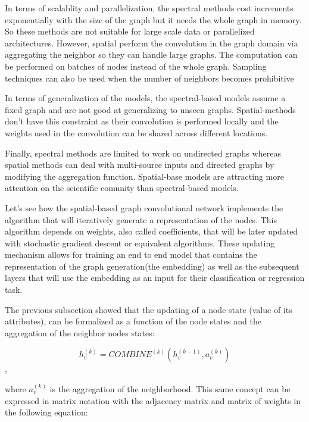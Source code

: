 In terms of scalablity and parallelization, the spectral methods  cost increments exponentially with the size of the graph but it needs the whole graph in memory. So these methods are not suitable for large scale data or parallelized architectures. However, spatial perform the convolution in the graph domain via aggregating the neighbor so they can handle large graphs. The computation can be performed on batches of nodes instead of the whole graph. Sampling techniques can also be used when the number of neighbors becomes prohibitive

In terms of generalization of the models, the spectral-based models assume a fixed graph and are not good at generalizing to unseen graphs. Spatial-methods don't have this constraint as their convolution is performed locally and the weights used in the convolution can be shared across different locations.

Finally, spectral methods are limited to work on undirected graphs whereas spatial methods can deal with multi-source inputs and directed graphs by modifying the aggregation function. Spatial-base models are attracting more attention on the scientific comunity than spectral-based models.




Let's see how the spatial-based graph convolutional network implements the algorithm that will iteratively generate a representation of the nodes. This algorithm depends on weights, also called coefficients, that will be later updated with stochastic gradient descent or equivalent algorithms. These updating mechanism allows for training an end to end model that contains the representation of the graph generation(the embedding) as well as the subsequent layers that will use the embedding as an input for their classification or regression task.

The previous subsection showed that the updating of a node state (value of its attributes), can be formalized as a function of the node states and the aggregation of the neighbor nodes states:

 $$ h_v^{(k)} = COMBINE^{(k)}(h_v^{(k-1)}, a_v^{(k)})$$,

where $a_v^{(k)}$ is the aggregation of the neighborhood. This same concept can be expressed in matrix notation with the adjacency matrix and matrix of weights in the following equation:


